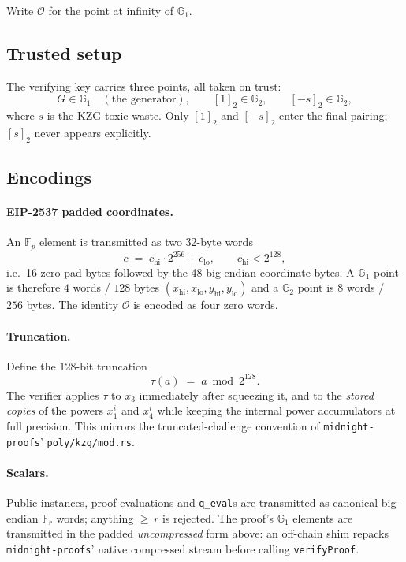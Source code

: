 \documentclass[11pt,a4paper]{article}
\newcommand{\Fr}{\ensuremath{\mathbb{F}_{r}}}
\newcommand{\Fp}{\ensuremath{\mathbb{F}_{p}}}
\newcommand{\Gone}{\ensuremath{\mathbb{G}_{1}}}
\newcommand{\Gtwo}{\ensuremath{\mathbb{G}_{2}}}
\newcommand{\Ident}{\ensuremath{\mathcal{O}}}
\newcommand{\trunc}{\ensuremath{\tau}}
\newcommand{\code}[1]{\texttt{#1}}
\theoremstyle{definition}
\begin{document}
Write $\Ident$ for the point at infinity of $\Gone$.

\subsection{Trusted setup}

The verifying key carries three points, all taken on trust:
\[
G \in \Gone \quad(\text{the generator}),\qquad
[1]_2 \in \Gtwo,\qquad
[-s]_2 \in \Gtwo,
\]
where $s$ is the KZG toxic waste. Only $[1]_2$ and $[-s]_2$ enter the final
pairing; $[s]_2$ never appears explicitly.

\subsection{Encodings}

\paragraph{EIP-2537 padded coordinates.}
An $\Fp$ element is transmitted as two 32-byte words
\[
c \;=\; c_{\mathrm{hi}}\cdot 2^{256} + c_{\mathrm{lo}},
\qquad
c_{\mathrm{hi}} < 2^{128},
\]
i.e.\ 16 zero pad bytes followed by the 48 big-endian coordinate bytes. A
$\Gone$ point is therefore $4$ words / $128$ bytes
$(x_{\mathrm{hi}},x_{\mathrm{lo}},y_{\mathrm{hi}},y_{\mathrm{lo}})$ and a
$\Gtwo$ point is $8$ words / $256$ bytes. The identity $\Ident$ is encoded as
four zero words.

\paragraph{Truncation.}
Define the 128-bit truncation
\[
\trunc(a) \;=\; a \bmod 2^{128}.
\]
The verifier applies $\trunc$ to $x_3$ immediately after squeezing it, and to
the \emph{stored copies} of the powers $x_1^{i}$ and $x_4^{i}$ while keeping
the internal power accumulators at full precision. This mirrors the
truncated-challenge convention of \code{midnight-proofs}'
\code{poly/kzg/mod.rs}.

\paragraph{Scalars.}
Public instances, proof evaluations and \code{q\_eval}s are transmitted as
canonical big-endian $\Fr$ words; anything ${\ge}\,r$ is rejected. The proof's
$\Gone$ elements are transmitted in the padded \emph{uncompressed} form above:
an off-chain shim repacks \code{midnight-proofs}' native compressed stream
before calling \code{verifyProof}.
\end{document}
